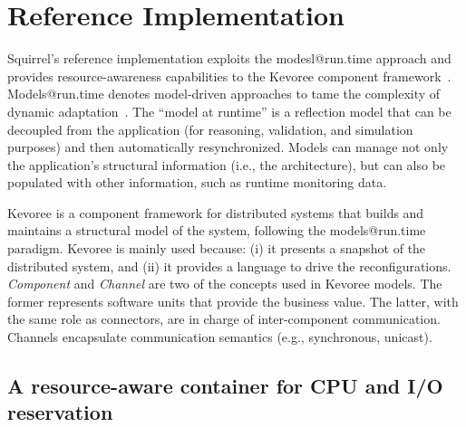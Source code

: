 \section{Reference Implementation} \label{sec:kevoree}

Squirrel's reference implementation exploits the modesl@run.time approach and provides resource-awareness capabilities to the Kevoree component framework~\cite{Fouquet:2012:DCM:2304736.2304759}.
Models@run.time denotes model-driven approaches to tame the complexity of dynamic adaptation~\cite{Morin:2009:TDA:1555001.1555028}.
The ``model at runtime'' is a reflection model that can be decoupled from the application (for reasoning, validation, and simulation purposes) and then automatically resynchronized.
Models can manage not only the application's structural information (i.e., the architecture), but can also be populated with other information, such as runtime monitoring data.

Kevoree is a component framework for distributed systems that builds and maintains a structural model of the system, following the models@run.time paradigm.
Kevoree is mainly used because: (i) it presents a snapshot of the distributed system, and (ii) it provides a language to drive the reconfigurations. 
\textit{Component} and \textit{Channel} are two of the concepts used in Kevoree models.
The former represents software units that provide the business value.
The latter, with the same role as connectors, are in charge of inter-component communication.
Channels encapsulate communication semantics (e.g., synchronous, unicast).

\subsection{A resource-aware container for CPU and I/O reservation} \label{sec:cgroups-based-reservation}

